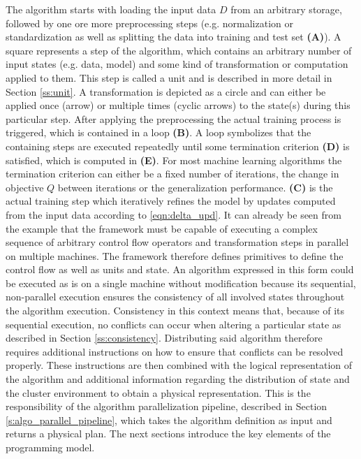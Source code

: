 The algorithm starts with loading the input data $D$ from an arbitrary storage, followed by one ore more preprocessing steps (e.g. normalization or standardization as well as splitting the data into training and test set \textbf{(A)}).
A square represents a step of the algorithm, which contains an arbitrary number of input states (e.g. data, model) and some kind of transformation or computation applied to them.
This step is called a unit and is described in more detail in Section \ref{ss:unit}.
A transformation is depicted as a circle and can either be applied once (arrow) or multiple times (cyclic arrows) to the state(s) during this particular step.
After applying the preprocessing the actual training process is triggered, which is contained in a loop \textbf{(B)}.
A loop symbolizes that the containing steps are executed repeatedly until some termination criterion \textbf{(D)} is satisfied, which is computed in \textbf{(E)}.
For most machine learning algorithms the termination criterion can either be a fixed number of iterations, the change in objective $Q$ between iterations or the generalization performance.
\textbf{(C)} is the actual training step which iteratively refines the model by updates computed from the input data according to \ref{eqn:delta_upd}.
It can already be seen from the example that the framework must be capable of executing a complex sequence of arbitrary control flow operators and transformation steps in parallel on multiple machines.
The framework therefore defines primitives to define the control flow as well as units and state.
An algorithm expressed in this form could be executed as is on a single machine without modification because its sequential, non-parallel execution ensures the consistency of all involved states throughout the algorithm execution.
Consistency in this context means that, because of its sequential execution, no conflicts can occur when altering a particular state as described in Section \ref{ss:consistency}.
Distributing said algorithm therefore requires additional instructions on how to ensure that conflicts can be resolved properly.
These instructions are then combined with the logical representation of the algorithm and additional information regarding the distribution of state and the cluster environment to obtain a physical representation.
This is the responsibility of the algorithm parallelization pipeline, described in Section \ref{s:algo_parallel_pipeline}, which takes the algorithm definition as input and returns a physical plan.
The next sections introduce the key elements of the programming model.

